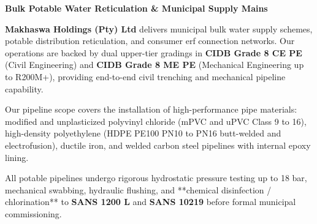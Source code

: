 \hypertarget{sec:waterretic}{}

\noindent
\begin{minipage}[t]{0.62\textwidth}
    \vspace{0pt}
    {\large\bfseries\color{mhnavy} Bulk Potable Water Reticulation \& Municipal Supply Mains}
    \vspace{0.12cm}

    {\fontsize{9pt}{13pt}\selectfont\color{mhtext}
    \textbf{Makhaswa Holdings (Pty) Ltd} delivers municipal bulk water supply schemes, potable distribution reticulation, and consumer erf connection networks. Our operations are backed by dual upper-tier gradings in \textbf{CIDB Grade 8 CE PE} (Civil Engineering) and \textbf{CIDB Grade 8 ME PE} (Mechanical Engineering up to R200M+), providing end-to-end civil trenching and mechanical pipeline capability.
    }

    \vspace{0.22cm}

    {\fontsize{9pt}{13pt}\selectfont\color{mhtext}
    Our pipeline scope covers the installation of high-performance pipe materials: modified and unplasticized polyvinyl chloride (mPVC and uPVC Class 9 to 16), high-density polyethylene (HDPE PE100 PN10 to PN16 butt-welded and electrofusion), ductile iron, and welded carbon steel pipelines with internal epoxy lining.
    }

    \vspace{0.22cm}

    {\fontsize{9pt}{13pt}\selectfont\color{mhtext}
    All potable pipelines undergo rigorous hydrostatic pressure testing up to 18 bar, mechanical swabbing, hydraulic flushing, and **chemical disinfection / chlorination** to \textbf{SANS 1200 L} and \textbf{SANS 10219} before formal municipal commissioning.
    }
\end{minipage}
\hfill
